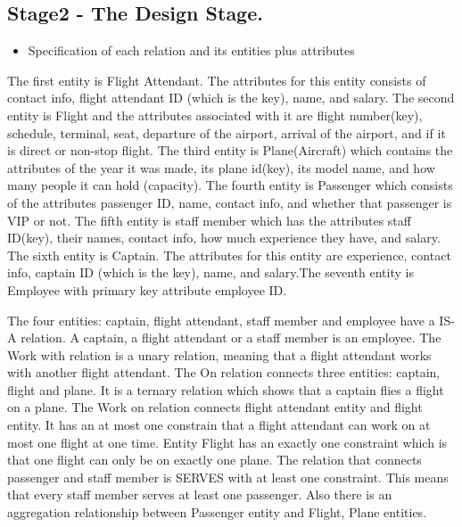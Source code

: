 \documentclass[10pt,conference]{IEEEtran}
\begin{document}
\subsection{Stage2 - The Design Stage. }\label{sec: 2:The Design Stage.}




\begin{itemize} \item{Specification of each relation and its entities plus attributes} \end{itemize}


\textnormal{The first entity is Flight Attendant. The attributes for this entity consists of contact info, flight attendant ID (which is the key), name, and salary. The second entity is Flight and the attributes associated with it are flight number(key), schedule, terminal, seat, departure of the airport, arrival of the airport, and if it is direct or non-stop flight. The third entity is Plane(Aircraft) which contains the attributes of the year it was made, its plane id(key), its model name, and how many people it can hold (capacity). The fourth entity is Passenger which consists of the attributes passenger ID, name, contact info, and whether that passenger is VIP or not. The fifth entity is staff member which has the attributes staff ID(key), their names, contact info, how much experience they have, and salary. The sixth entity is Captain. The attributes for this entity are experience, contact info, captain ID (which is the key), name, and salary.The seventh entity is Employee with primary key attribute employee ID.} 

\textnormal{The four entities: captain, flight attendant, staff member and employee have a IS-A relation. A captain, a flight attendant or a staff member is an employee. The Work with relation is a unary relation, meaning that a flight attendant works with another flight attendant. The On relation connects three entities: captain, flight and plane. It is a ternary relation which shows that a captain flies a flight on a plane. The Work on relation connects flight attendant entity and flight entity. It has an at most one constrain that a flight attendant can work on at most one flight at one time. Entity Flight has an exactly one constraint which is that one flight can only be on exactly one plane. The relation that connects passenger and staff member is SERVES with at least one constraint. This means that every staff member serves at least one passenger. Also there is an aggregation relationship between Passenger entity and Flight, Plane entities.}
\end{document}
